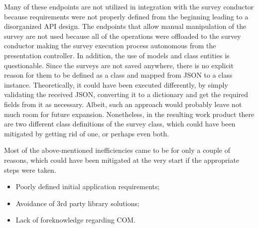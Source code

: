 \documentclass[12pt, fleqn, a4paper]{article}
\begin{document}
Many of these endpoints are not utilized in integration with the survey conductor because requirements were not properly defined from the beginning leading to a disorganized API design. The endpoints that allow manual manipulation of the survey are not used because all of the operations were offloaded to the survey conductor making the survey execution process autonomous from the presentation controller.
In addition, the use of models and class entities is questionable. Since the surveys are not saved anywhere, there is no explicit reason for them to be defined as a class and mapped from JSON to a class instance. 
Theoretically, it could have been executed differently, by simply validating the received JSON, converting it to a dictionary and get the required fields from it as necessary. Albeit, such an approach would probably leave not much room for future expansion.
Nonetheless, in the resulting work product there are two different class definitions of the survey class, which could have been mitigated by getting rid of one, or perhaps even both.\par
Most of the above-mentioned inefficiencies came to be for only a couple of reasons, which could have been mitigated at the very start if the appropriate steps were taken.
\begin{itemize}
	\item Poorly defined initial application requirements;
	\item Avoidance of 3rd party library solutions;
	\item Lack of foreknowledge regarding COM.
\end{itemize}


\end{document}
